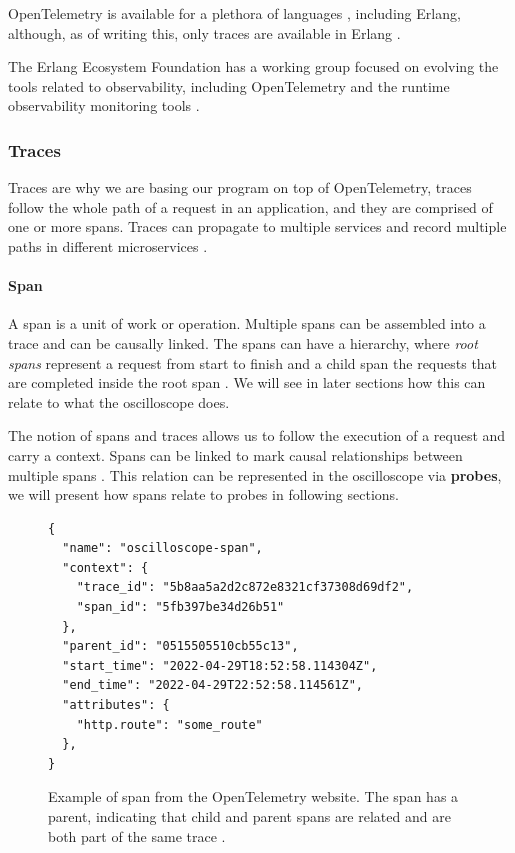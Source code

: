    OpenTelemetry is available for a plethora of languages \cite{otel-l}, including Erlang, although, as of writing this, only traces are available in Erlang \cite{otel-in}.
     
    The Erlang Ecosystem Foundation has a working group focused on evolving the tools related to observability, including OpenTelemetry and the runtime observability monitoring tools \cite{obs-group}. 
    
    \subsubsection{Traces}
        Traces are why we are basing our program on top of OpenTelemetry, traces follow the whole path of a request in an application, and they are comprised of one or more spans. Traces can propagate to multiple services and record multiple paths in different microservices \cite{otel-dt}. 
        
        \paragraph{Span} A span is a unit of work or operation. Multiple spans can be assembled into a trace and can be causally linked. The spans can have a hierarchy, where \textit{root spans} represent a request from start to finish and a child span the requests that are completed inside the root span \cite{otel-dt}. We will see in later sections how this can relate to what the oscilloscope does.

    The notion of spans and traces allows us to follow the execution of a request and carry a context. Spans can be linked to mark causal relationships between multiple spans \cite{otel-t}. This relation can be represented in the oscilloscope via \textbf{probes}, we will present how spans relate to probes in following sections.
    \begin{figure}[H]
    \begin{verbatim} 
{
  "name": "oscilloscope-span",
  "context": {
    "trace_id": "5b8aa5a2d2c872e8321cf37308d69df2",
    "span_id": "5fb397be34d26b51"
  },
  "parent_id": "0515505510cb55c13",
  "start_time": "2022-04-29T18:52:58.114304Z",
  "end_time": "2022-04-29T22:52:58.114561Z",
  "attributes": {
    "http.route": "some_route"
  },
}
    \end{verbatim}
    \caption{Example of span from the OpenTelemetry website. The span has a parent, indicating that child and parent spans are related and are both part of the same trace \cite{otel-t}.}%
    \end{figure}

